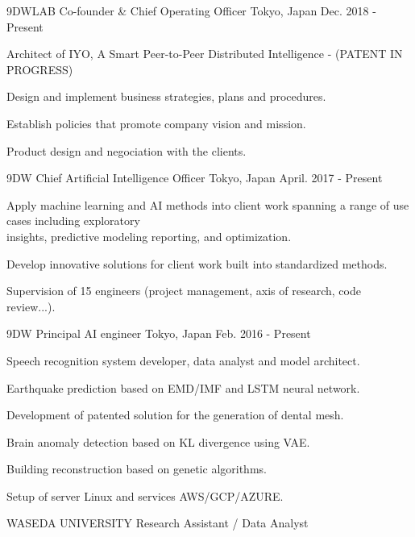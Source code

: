 \begin{cventries}
  \cventry
    {9DWLAB}
    {Co-founder \& Chief Operating Officer}
    {Tokyo, Japan}
    {Dec. 2018 - Present}
    {
      \begin{cvitems}
        \item {Architect of IYO, A Smart Peer-to-Peer Distributed Intelligence - (PATENT IN PROGRESS)}
        \item {Design and implement business strategies, plans and procedures.}
        \item {Establish policies that promote company vision and mission.}
        \item {Product design and negociation with the clients.}
      \end{cvitems}
    }
    \cventry
    {9DW}
    {Chief Artificial Intelligence Officer}
    {Tokyo, Japan}
    {April. 2017 - Present}
    {
      \begin{cvitems}
        \item {Apply machine learning and AI methods into client work spanning a range of use cases including exploratory\\
         insights, predictive modeling reporting, and optimization.}
        \item {Develop innovative solutions for client work built into standardized methods.}
        \item {Supervision of 15 engineers (project management, axis of research, code review...).}
      \end{cvitems}
    }
    \cventry
    {9DW}
    {Principal AI engineer}
    {Tokyo, Japan}
    {Feb. 2016 - Present}
    {
      \begin{cvitems}
        \item {Speech recognition system developer, data analyst and model architect.}
        \item {Earthquake prediction based on EMD/IMF and LSTM neural network.}
        \item {Development of patented solution for the generation of dental mesh.}
        \item {Brain anomaly detection based on KL divergence using VAE.}
        \item {Building reconstruction based on genetic algorithms.}
        \item {Setup of server Linux and services AWS/GCP/AZURE.}
      \end{cvitems}
    }
  \cventry
    {WASEDA UNIVERSITY}
    {Research Assistant / Data Analyst}

\end{cventries}
